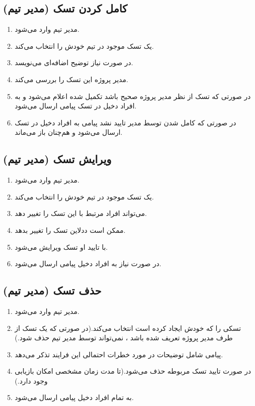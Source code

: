 \documentclass[10pt,a4paper]{article}
\begin{document}
\subsection{
	کامل کردن تسک (مدیر تیم)
}

\begin{enumerate}
	\item 
	مدیر تیم وارد می‌شود.
	\item
	یک تسک موجود در تیم خودش را انتخاب می‌کند.
	\item
	در صورت نیاز توضیح اضافه‌ای می‌نویسد.
	\item
	مدیر پروژه این تسک را بررسی می‌کند.
	\item
	در صورتی که تسک از نظر مدیر پروژه صحیح باشد تکمیل شده اعلام می‌شود و به افراد دخیل در تسک پیامی ارسال می‌شود.
	\item
	در صورتی که کامل شدن توسط مدیر تایید نشد پیامی به افراد دخیل در تسک ارسال می‌شود و هم‌چنان باز می‌ماند.
	
\end{enumerate}


\subsection{
	ویرایش تسک (مدیر تیم)
}

\begin{enumerate}
	\item 
	مدیر تیم وارد می‌شود.
	\item
	یک تسک موجود در تیم خودش را انتخاب می‌کند.
	\item
	می‌تواند افراد مرتبط با این تسک را تغییر دهد.
	\item
	ممکن است ددلاین تسک را تغییر بدهد.
	\item
	با تایید او تسک ویرایش می‌شود.
	\item
	در صورت نیاز به افراد دخیل پیامی ارسال می‌شود.
\end{enumerate}

\subsection{
	حذف تسک (مدیر تیم)
}

\begin{enumerate}
	\item 
	مدیر تیم وارد می‌شود.
	\item
	تسکی را که خودش ایجاد کرده است انتخاب می‌کند.(در صورتی که یک تسک از طرف مدیر پروژه تعریف شده باشد ، نمی‌تواند توسط مدیر تیم حذف شود.)
	\item
	پیامی شامل توضیحات در مورد خطرات احتمالی این فرایند تذکر می‌دهد.
	\item
	در صورت تایید تسک مربوطه حذف می‌شود.(تا مدت زمان مشخصی امکان بازیابی وجود دارد.)
	\item
	به تمام افراد دخیل پیامی ارسال می‌شود.
\end{enumerate}
\end{document}
